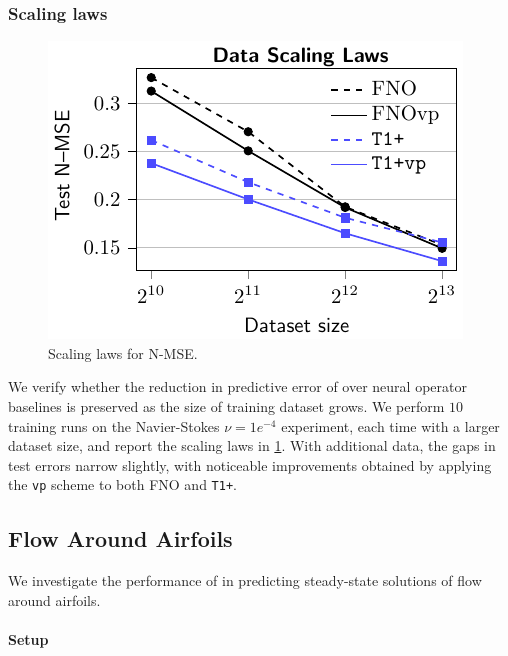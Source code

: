 \subsubsection{Scaling laws}\label{subsubsec:ns_sl}
%
\begin{figure}
    \centering
    \vspace{-10mm}
    \includegraphics[width=\linewidth]{figures/scaling_law.pdf}
    \vspace{-5.5mm}
    \caption{\small Scaling laws for N-MSE.}
    \label{fig:scaling_law}
\end{figure}
%
We verify whether the reduction in predictive error of \ourmethod{} over neural operator baselines is preserved as the size of training dataset grows. We perform $10$ training runs on the Navier-Stokes $\nu=1e^{-4}$ experiment, each time with a larger dataset size, and report the scaling laws in \cref{fig:scaling_law}. With additional data, the gaps in test errors narrow slightly, with noticeable improvements obtained by applying the {\tt vp} scheme to both FNO and {\tt T1+}.



\subsection{Flow Around Airfoils}\label{subsec:dfp}
%
We investigate the performance of \ourmethod{} in predicting steady-state solutions of flow around airfoils. 

\paragraph{Setup}

